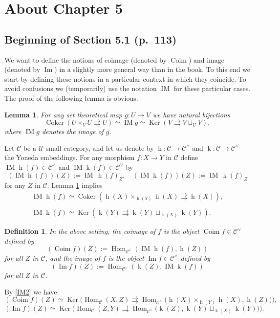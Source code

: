 \documentclass[12pt]{article}
\newtheorem{lem}[thm]{Lemma}
\newtheorem{df}[thm]{Definition}%
\theoremstyle{remark}
\theoremstyle{definition}
\newcommand{\C}{\mathcal C}
\newcommand{\U}{\mathcal U}
\newcommand{\parar}{\rightrightarrows}
\DeclareMathOperator{\Coim}{Coim}
\DeclareMathOperator{\Coker}{Coker}
\DeclareMathOperator{\Ima}{Im}
\DeclareMathOperator{\IM}{IM}
\DeclareMathOperator{\hy}{h}
\DeclareMathOperator{\ky}{k}
\DeclareMathOperator{\Hom}{Hom}%
\DeclareMathOperator{\Ker}{Ker}
\begin{document}
\section{About Chapter 5}
%
\subsection{Beginning of Section 5.1 (p.~113)} %
%
We want to define the notions of coimage (denoted by $\Coim$) and image (denoted by $\Ima$) in a slightly more general way than in the book. To this end we start by defining these notions in a particular context in which they coincide. To avoid confusions we (temporarily) use the notation $\IM$ for these particular cases. The proof of the following lemma is obvious. 
%
\begin{lem}\label{imset} 
For any set theoretical map $g:U\to V$ we have natural bijections 
$$ 
\Coker(U\times_VU\parar U)\simeq\IM g\simeq\Ker(V\parar V\sqcup_UV),
$$ 
where $\IM g$ denotes the image of $g$. 
\end{lem} 

Let $\C$ be a $\U$-small category, and let us denote by $\hy:\C\to\C^\wedge$ and $\ky:\C\to\C^\vee$ the Yoneda embeddings. For any morphism $f:X\to Y$ in $\C$ define $\IM\hy(f)\in\C^\wedge$ and $\IM\ky(f)\in\C^\vee$ by
$$
(\IM\hy(f))(Z):=\IM\,\hy(f)_Z,\quad(\IM\ky(f))(Z):=\IM\,\ky(f)_Z 
$$
for any $Z$ in $\C$. Lemma \ref{imset} implies
%
\begin{equation}\label{IM2}
\begin{split}
\IM\hy(f)\simeq\Coker(\hy(X)\times_{\hy(Y)}\hy(X)\parar\hy(X)),\\ \\ 
\IM\ky(f)\simeq\Ker(\ky(Y)\parar\ky(Y)\sqcup_{\ky(X)}\ky(Y)).
\end{split}
\end{equation}
%
\begin{df} 
In the above setting, the {\em coimage} of $f$ is the object $\Coim f\in\C^\vee$ defined by 
$$ 
(\Coim f)(Z):=\Hom_{\C^\wedge}(\IM\hy(f),\hy(Z))
$$ 
for all $Z$ in $\C$, and the {\em image} of $f$ is the object $\Ima f\in\C^\wedge$ defined by 
$$ 
(\Ima f)(Z):=\Hom_{\C^\vee}(\ky(Z),\IM\ky(f)) 
$$ 
for all $Z$ in $\C$. 
\end{df} 
%

By \eqref{IM2} we have 
$$ 
(\Coim f)(Z)\simeq\Ker\Big(\Hom_\C(X,Z)\parar\Hom_{\C^\wedge}\big(\hy(X)\times_{\hy(Y)}\hy(X),\hy(Z)\big)\Big), 
$$ 
$$ 
(\Ima f)(Z)\simeq\Ker\Big(\Hom_\C(Z,Y)\parar\Hom_{\C^\vee}\big(\ky(Z),\ky(Y)\sqcup_{\ky(X)}\ky(Y)\big)\Big). 
$$
 
\end{document}
